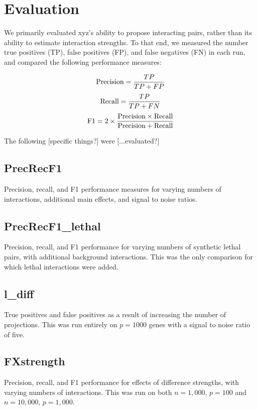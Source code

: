 \documentclass{amsart}
\begin{document}
\section{Evaluation}

We primarily evaluated xyz's ability to propose interacting pairs, rather than its ability to estimate interaction strengths. To that end, we measured the number true positives (TP), false positives (FP), and false negatives (FN) in each run, and compared the following performance measures:

$$\textnormal{Precision} = \frac{TP}{TP + FP}$$
$$\textnormal{Recall} = \frac{TP}{TP + FN}$$
$$\textnormal{F1} = 2 \times \frac{\textnormal{Precision} \times \textnormal{Recall}}{\textnormal{Precision} + \textnormal{Recall}}$$

The following [specific things?] were [...evaluated?]

\subsection{PrecRecF1}
Precision, recall, and F1 performance measures for varying numbers of interactions, additional main effects, and signal to noise ratios.

\subsection{PrecRecF1\_lethal}
Precision, recall, and F1 performance for varying numbers of synthetic lethal pairs, with additional background interactions. This was the only comparison for which lethal interactions were added.

\subsection{l\_diff}
True positives and false positives as a result of increasing the number of projections. This was run entirely on $p = 1000$ genes with a signal to noise ratio of five.

\subsection{FXstrength}
Precision, recall, and F1 performance for effects of difference strengths, with varying numbers of interactions. This was run on both $n = 1,000$, $p = 100$ and $n = 10,000$, $p = 1,000$.
\end{document}
